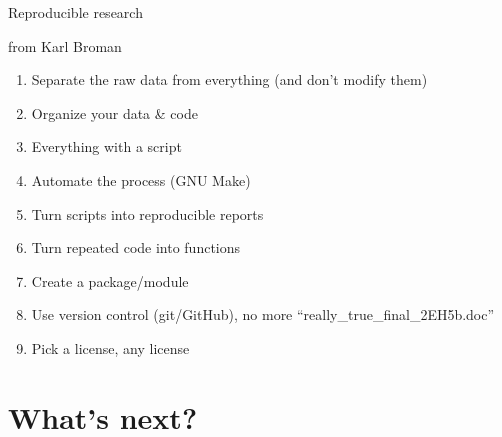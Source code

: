 \documentclass[8pt,ignorenonframetext,]{beamer}
\providecommand{\tightlist}{%
  \setlength{\itemsep}{0pt}\setlength{\parskip}{0pt}}
\begin{document}
\begin{frame}{Reproducible research}

from Karl Broman

\begin{enumerate}
\def\labelenumi{\arabic{enumi}.}
\setcounter{enumi}{-1}
\tightlist
\item
  Separate the raw data from everything (and don't modify them)
\item
  Organize your data \& code
\item
  Everything with a script
\item
  Automate the process (GNU Make)
\item
  Turn scripts into reproducible reports
\item
  Turn repeated code into functions
\item
  Create a package/module
\item
  Use version control (git/GitHub), no more
  ``really\_true\_final\_2EH5b.doc''
\item
  Pick a license, any license
\end{enumerate}

\end{frame}

\section{What's next?}\label{whats-next}
\end{document}
